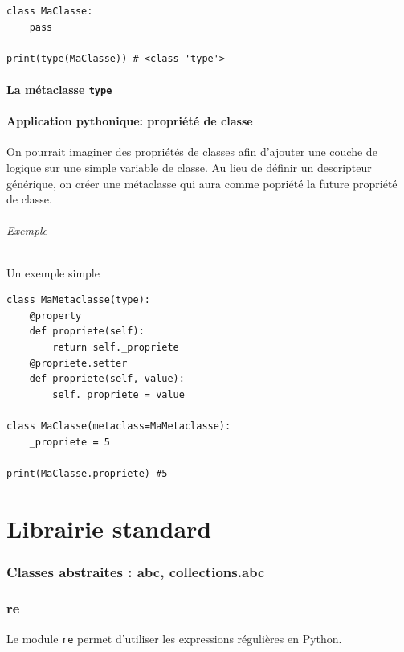 \documentclass[a4paper, 10pt]{article}
\begin{document}
\begin{verbatim}
class MaClasse:
    pass

print(type(MaClasse)) # <class 'type'>
\end{verbatim}

\subsection{La métaclasse \texttt{type}}



\subsection{Application pythonique: propriété de classe}
On pourrait imaginer des propriétés de classes afin d'ajouter une couche de logique sur une simple variable de classe. Au lieu de définir un descripteur générique, on créer une métaclasse qui aura comme popriété la future propriété de classe.

\paragraph{Exemple} Un exemple simple
\begin{verbatim}
class MaMetaclasse(type):
    @property
    def propriete(self):
        return self._propriete
    @propriete.setter
    def propriete(self, value):
        self._propriete = value

class MaClasse(metaclass=MaMetaclasse):
    _propriete = 5

print(MaClasse.propriete) #5
\end{verbatim}

\newpage

\part{Librairie standard}

\section{Classes abstraites : abc, collections.abc}\label{abc}

\section{re}
Le module \texttt{re} permet d'utiliser les expressions régulières en Python.
\end{document}
